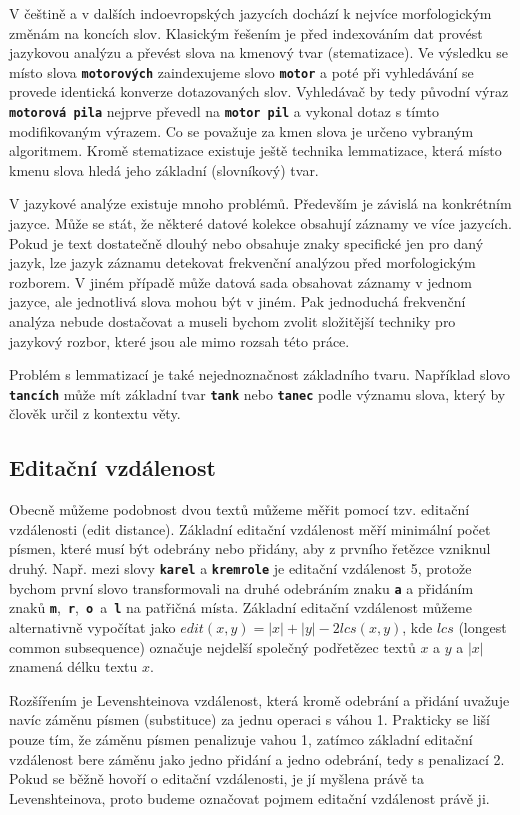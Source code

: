 \documentclass[11pt,letterpaper,oneside,openright]{book}
\newcommand{\bftt}[1]{\texttt{\textbf{#1}}}
\begin{document}
V češtině a v dalších indoevropských jazycích dochází k nejvíce morfologickým
změnám na koncích slov. Klasickým řešením je před indexováním dat provést
jazykovou analýzu a převést slova na kmenový tvar (stematizace). Ve výsledku se
místo slova \bftt{motorových} zaindexujeme slovo \bftt{motor} a poté při
vyhledávání se provede identická konverze dotazovaných slov. Vyhledávač by tedy
původní výraz \bftt{motorová pila} nejprve převedl na \bftt{motor pil} a
vykonal dotaz s tímto modifikovaným výrazem. Co se považuje za kmen slova je
určeno vybraným algoritmem. Kromě stematizace existuje ještě technika
lemmatizace, která místo kmenu slova hledá jeho základní (slovníkový) tvar.

V jazykové analýze existuje mnoho problémů. Především je závislá na konkrétním
jazyce. Může se stát, že některé datové kolekce obsahují záznamy ve více
jazycích. Pokud je text dostatečně dlouhý nebo obsahuje znaky specifické jen
pro daný jazyk, lze jazyk záznamu detekovat frekvenční analýzou před
morfologickým rozborem. V jiném případě může datová sada obsahovat záznamy v
jednom jazyce, ale jednotlivá slova mohou být v jiném. Pak jednoduchá
frekvenční analýza nebude dostačovat a museli bychom zvolit složitější techniky
pro jazykový rozbor, které jsou ale mimo rozsah této práce.

Problém s lemmatizací je také nejednoznačnost základního tvaru. Například slovo
\bftt{tancích} může mít základní tvar \bftt{tank} nebo \bftt{tanec} podle
významu slova, který by člověk určil z kontextu věty.

\subsection{Editační vzdálenost}
Obecně můžeme podobnost dvou textů můžeme měřit pomocí tzv. editační
vzdálenosti (edit distance). Základní editační vzdálenost měří minimální počet
písmen, které musí být odebrány nebo přidány, aby z prvního řetězce vzniknul
druhý. Např. mezi slovy \bftt{karel} a \bftt{kremrole} je editační vzdálenost
5, protože bychom první slovo transformovali na druhé odebráním znaku \bftt{a}
a přidáním znaků \bftt{m},~\bftt{r},~\bftt{o}~a~\bftt{l} na patřičná místa.
Základní editační vzdálenost můžeme alternativně vypočítat jako $edit(x, y) =
|x| + |y| - 2 lcs(x, y)$, kde $lcs$ (longest common subsequence) označuje
nejdelší společný podřetězec textů $x$ a $y$ a $|x|$ znamená délku textu $x$.

Rozšířením je Levenshteinova vzdálenost, která kromě odebrání a přidání uvažuje
navíc záměnu písmen (substituce) za jednu operaci s váhou 1. Prakticky se liší
pouze tím, že záměnu písmen penalizuje vahou 1, zatímco základní editační
vzdálenost bere záměnu jako jedno přidání a jedno odebrání, tedy s penalizací
2. Pokud se běžně hovoří o editační vzdálenosti, je jí myšlena právě ta
Levenshteinova, proto budeme označovat pojmem editační vzdálenost právě ji.
\end{document}
